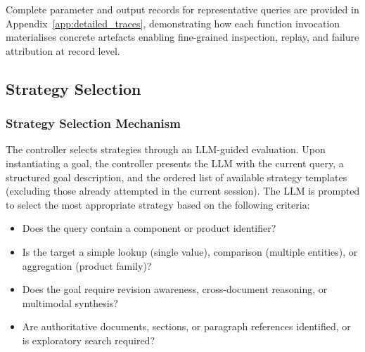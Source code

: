 \documentclass[largeformat]{interact}
\begin{document}
Complete parameter and output records for representative queries are provided in Appendix~\ref{app:detailed_traces}, demonstrating how each function invocation materialises concrete artefacts enabling fine-grained inspection, replay, and failure attribution at record level.


\subsection{Strategy Selection}
\label{subsec:strategy_selection}

\subsubsection{Strategy Selection Mechanism}
\label{subsubsec:strategy_selection_mechanism}
The controller selects strategies through an LLM-guided evaluation. Upon instantiating a goal, the controller presents the LLM with the current query, a structured goal description, and the ordered list of available strategy templates (excluding those already attempted in the current session). The LLM is prompted to select the most appropriate strategy based on the following criteria:
\begin{itemize}[label=-]
    \item {} Does the query contain a component or product identifier?
    \item {} Is the target a simple lookup (single value), comparison (multiple entities), or aggregation (product family)?
    \item {} Does the goal require revision awareness, cross-document reasoning, or multimodal synthesis?
    \item {} Are authoritative documents, sections, or paragraph references identified, or is exploratory search required?
\end{itemize}
 
\end{document}
